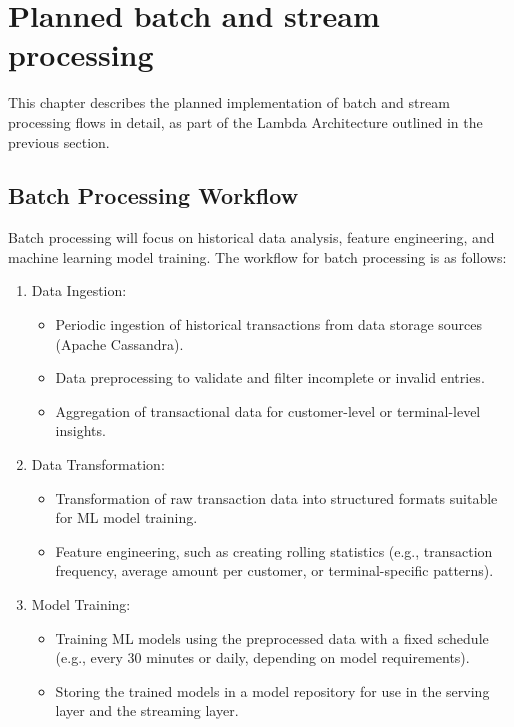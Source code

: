 \documentclass[12pt,a4paper, hidelinks]{article}
\begin{document}
\section{Planned batch and stream processing}

This chapter describes the planned implementation of batch and stream processing flows in detail, as part of the Lambda Architecture outlined in the previous section.

\subsection{Batch Processing Workflow}
Batch processing will focus on historical data analysis, feature engineering, and machine learning model training. The workflow for batch processing is as follows:

\begin{enumerate}
    \item Data Ingestion:
        \begin{itemize}
            \item Periodic ingestion of historical transactions from data storage sources (Apache Cassandra).
            \item Data preprocessing to validate and filter incomplete or invalid entries.
            \item Aggregation of transactional data for customer-level or terminal-level insights.
        \end{itemize}
    \item Data Transformation:
        \begin{itemize}
            \item Transformation of raw transaction data into structured formats suitable for ML model training.
            \item Feature engineering, such as creating rolling statistics (e.g., transaction frequency, average amount per customer, or terminal-specific patterns).
        \end{itemize}
    \item Model Training:
        \begin{itemize}
            \item Training ML models using the preprocessed data with a fixed schedule (e.g., every 30 minutes or daily, depending on model requirements).
            \item Storing the trained models in a model repository for use in the serving layer and the streaming layer.
        \end{itemize}
\end{enumerate}
\end{document}
